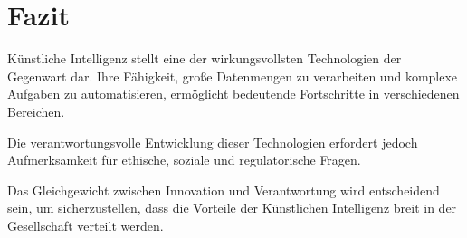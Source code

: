 \section{Fazit}

Künstliche Intelligenz stellt eine der wirkungsvollsten Technologien der Gegenwart dar. Ihre Fähigkeit, große Datenmengen zu verarbeiten und komplexe Aufgaben zu automatisieren, ermöglicht bedeutende Fortschritte in verschiedenen Bereichen.

Die verantwortungsvolle Entwicklung dieser Technologien erfordert jedoch Aufmerksamkeit für ethische, soziale und regulatorische Fragen.

Das Gleichgewicht zwischen Innovation und Verantwortung wird entscheidend sein, um sicherzustellen, dass die Vorteile der Künstlichen Intelligenz breit in der Gesellschaft verteilt werden.  